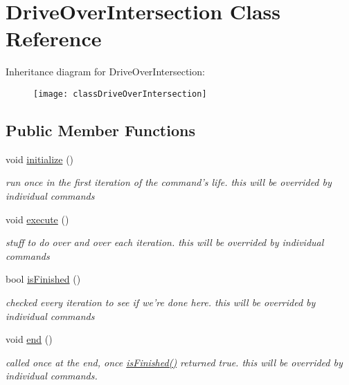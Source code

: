 \hypertarget{classDriveOverIntersection}{\section{Drive\-Over\-Intersection Class Reference}
\label{classDriveOverIntersection}
}
Inheritance diagram for Drive\-Over\-Intersection\-:\begin{figure}[H]
\begin{center}
\leavevmode
\texttt{[image: classDriveOverIntersection]}
\end{center}
\end{figure}
\subsection*{Public Member Functions}
\begin{DoxyCompactItemize}
\item 
\hypertarget{classDriveOverIntersection_a1c8abfebdde3f16e3110bca280365640}{void \hyperlink{classDriveOverIntersection_a1c8abfebdde3f16e3110bca280365640}{initialize} ()}\label{classDriveOverIntersection_a1c8abfebdde3f16e3110bca280365640}

\begin{DoxyCompactList}\small\item\em run once in the first iteration of the command's life. this will be overrided by individual commands \end{DoxyCompactList}\item 
\hypertarget{classDriveOverIntersection_a0bb9f5c91c23583810510f60cdd49523}{void \hyperlink{classDriveOverIntersection_a0bb9f5c91c23583810510f60cdd49523}{execute} ()}\label{classDriveOverIntersection_a0bb9f5c91c23583810510f60cdd49523}

\begin{DoxyCompactList}\small\item\em stuff to do over and over each iteration. this will be overrided by individual commands \end{DoxyCompactList}\item 
bool \hyperlink{classDriveOverIntersection_a5dc540c24099462e2bc14923648f42b0}{is\-Finished} ()
\begin{DoxyCompactList}\small\item\em checked every iteration to see if we're done here. this will be overrided by individual commands \end{DoxyCompactList}\item 
\hypertarget{classDriveOverIntersection_a90d8b3592d6c67e9ef1ae1a6396aa1c2}{void \hyperlink{classDriveOverIntersection_a90d8b3592d6c67e9ef1ae1a6396aa1c2}{end} ()}\label{classDriveOverIntersection_a90d8b3592d6c67e9ef1ae1a6396aa1c2}

\begin{DoxyCompactList}\small\item\em called once at the end, once \hyperlink{classDriveOverIntersection_a5dc540c24099462e2bc14923648f42b0}{is\-Finished()} returned true. this will be overrided by individual commands. \end{DoxyCompactList}\end{DoxyCompactItemize}
